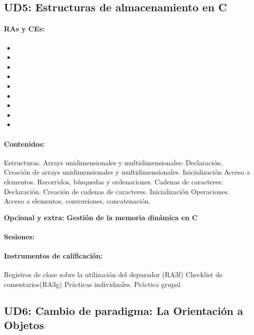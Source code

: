 \newpage
\subsection{UD5: Estructuras de almacenamiento en C}
	\paragraph{RAs y CEs:}
	\begin{itemize}[itemsep=0.1em, topsep=0.1em]
		\item\RAUNOf
		\item\RAUNOi			
		\item\RATRESe
		\item\RATRESf
		\item\RATRESg
		\item\RASEISa
		\item\RACINCOa
		\item\RACINCOb
		\item\RACINCOc	
	\end{itemize}
 	
 		\paragraph{Contenidos:}
		Estructuras.
		Arrays unidimensionales y multidimensionales:  Declaración.  Creación de arrays unidimensionales y multidimensionales.  Inicialización  Acceso a elementos.  Recorridos, búsquedas y ordenaciones.
		Cadenas de caracteres: Declaración.  Creación de cadenas de caracteres.  Inicialización Operaciones. Acceso a elementos, conversiones, concatenación.

		\textbf{Opcional y extra: Gestión de la memoria dinámica en C}


	\paragraph{Sesiones:}
	\paragraph{Instrumentos de calificación:}
		Registros de clase sobre la utilización del depurador (RA3f)
		Checklist de comentarios(RA3g)
		Prácticas individuales.
		Práctica grupal



\newpage
\subsection{UD6: Cambio de paradigma: La Orientación a Objetos}

